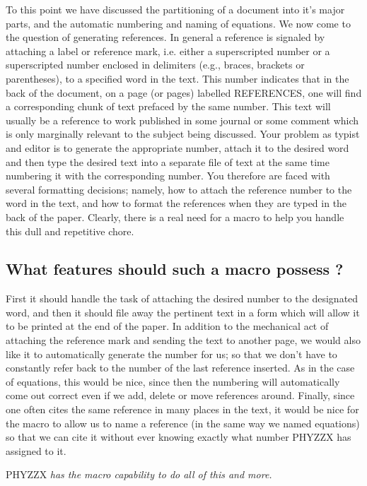 To this point we have discussed the partitioning of a document
into it's major parts, and the automatic numbering and naming
of equations.
We now come to the question of generating references.
In general a reference is signaled by attaching a
label or reference mark, i.e.
either a superscripted number or a superscripted number
enclosed in delimiters (e.g., braces, brackets or parentheses),
to a specified word in the text.
This number indicates that in the back of the document, on a page
(or pages) labelled REFERENCES, one will find a corresponding
chunk of text prefaced by the same number.
This text will usually be
a reference to work published in some journal
or some comment which is only marginally relevant to the subject
being discussed.
Your problem as typist and editor is to generate the appropriate
number, attach it to the desired word and then type the desired
text into a separate file of text at the same time numbering it
with the corresponding number.
You therefore are faced with several formatting decisions;
namely, how to attach the reference number to the word in
the text, and how to format the references when they are typed
in the back of the paper.
Clearly, there is a real need for a macro
to help you handle this dull and repetitive chore.
 
\subsection{What features should such a macro possess ?}
 
First it should handle the task of
attaching the desired number to the designated word, and
then it should file away the pertinent text in a form which will
allow it to be printed at the end of the paper.
In addition to the mechanical act of attaching the reference mark and
sending the text to another page, we would also like it
to automatically generate the number for us; so that we don't have to
constantly refer back to the number of the last reference
inserted.
As in the case of equations, this would be nice, since then
the numbering will automatically come out correct even if we
add, delete or move references around.
Finally, since one often cites the same reference
in many places in the text, it would be nice for the macro to
allow us to name a reference (in the same way we named equations)
so that we can cite it without ever knowing exactly
what number PHYZZX has assigned to it.\nextline
 
\centerline{PHYZZX \it has the macro capability to do all of this
and more.}
 
